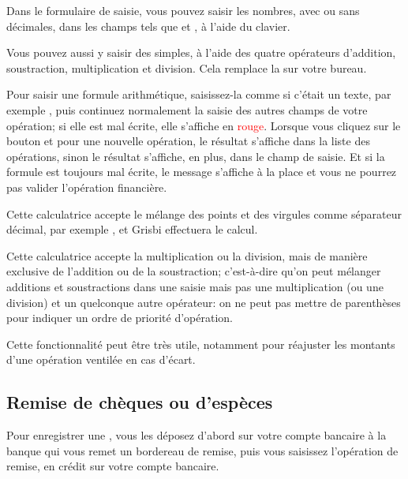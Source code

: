 Dans le formulaire de saisie, vous pouvez saisir les nombres, avec ou sans décimales, dans les champs tels que  et , à l'aide du clavier.

Vous pouvez aussi y saisir des  simples, à l'aide des quatre opérateurs d'addition, soustraction, multiplication et division. Cela remplace la  sur votre bureau.

Pour saisir une formule arithmétique, saisissez-la comme si c'était un texte, par exemple , puis continuez normalement la saisie des autres champs de votre opération; si elle est mal écrite, elle s'affiche en \textcolor{red}{rouge}. Lorsque vous cliquez sur le bouton  et pour une nouvelle opération, le résultat  s'affiche dans la liste des opérations, sinon le résultat s'affiche, en plus, dans le champ de saisie. Et si la formule est toujours mal écrite, le message  s'affiche à la place et vous ne pourrez pas valider l'opération financière.

Cette calculatrice accepte le mélange des points et des virgules comme séparateur décimal, par exemple , et Grisbi effectuera le calcul.

Cette calculatrice accepte la multiplication ou la division, mais de manière exclusive de l'addition ou de la soustraction; c'est-à-dire qu'on peut mélanger additions et soustractions dans une saisie mais pas une multiplication (ou une division) et un quelconque autre opérateur: on ne peut pas mettre de parenthèses pour indiquer un ordre de priorité d'opération.

Cette fonctionnalité peut être très utile, notamment pour réajuster les montants d'une opération ventilée en cas d'écart.


\subsection{Remise de chèques ou d'espèces\label{transactions-new-cheque}}

Pour enregistrer une , vous les déposez d'abord sur votre compte bancaire à la banque qui vous remet un bordereau de remise, puis vous saisissez l'opération de remise, en crédit sur votre compte bancaire.

